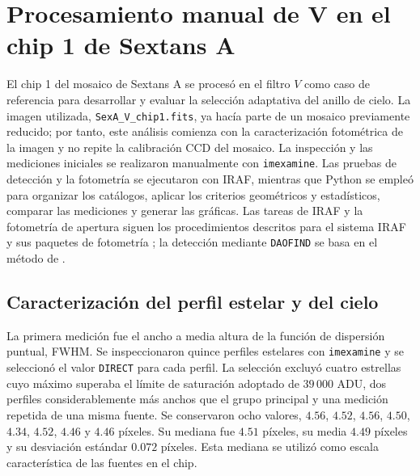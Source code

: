 \documentclass[12pt,letterpaper,oneside]{book}
\begin{document}

\section{Procesamiento manual de V en el chip 1 de Sextans A}
\label{sec:sextans-chip1}

El chip 1 del mosaico de Sextans A se procesó en el filtro $V$ como caso de referencia para desarrollar y evaluar la selección adaptativa del anillo de cielo. La imagen utilizada, \texttt{SexA\_V\_chip1.fits}, ya hacía parte de un mosaico previamente reducido; por tanto, este análisis comienza con la caracterización fotométrica de la imagen y no repite la calibración CCD del mosaico. La inspección y las mediciones iniciales se realizaron manualmente con \texttt{imexamine}. Las pruebas de detección y la fotometría se ejecutaron con IRAF, mientras que Python se empleó para organizar los catálogos, aplicar los criterios geométricos y estadísticos, comparar las mediciones y generar las gráficas. Las tareas de IRAF y la fotometría de apertura siguen los procedimientos descritos para el sistema IRAF y sus paquetes de fotometría \citep{tody1986,davis1989}; la detección mediante \texttt{DAOFIND} se basa en el método de \citet{stetson1987}.

\subsection{Caracterización del perfil estelar y del cielo}

La primera medición fue el ancho a media altura de la función de dispersión puntual, FWHM. Se inspeccionaron quince perfiles estelares con \texttt{imexamine} y se seleccionó el valor \texttt{DIRECT} para cada perfil. La selección excluyó cuatro estrellas cuyo máximo superaba el límite de saturación adoptado de $39\,000$ ADU, dos perfiles considerablemente más anchos que el grupo principal y una medición repetida de una misma fuente. Se conservaron ocho valores, $4.56$, $4.52$, $4.56$, $4.50$, $4.34$, $4.52$, $4.46$ y $4.46$ píxeles. Su mediana fue $4.51$ píxeles, su media $4.49$ píxeles y su desviación estándar $0.072$ píxeles. Esta mediana se utilizó como escala característica de las fuentes en el chip.
\end{document}
